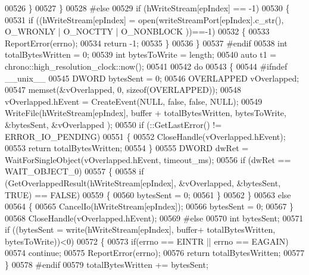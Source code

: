 \begin{DoxyCode}
00526         \}
00527     \}
00528 \textcolor{preprocessor}{#else}
00529     \textcolor{keywordflow}{if} (hWriteStream[epIndex] == -1)
00530     \{
00531        \textcolor{keywordflow}{if} ((hWriteStream[epIndex] = open(writeStreamPort[epIndex].c\_str(), O\_WRONLY | O\_NOCTTY | O\_NONBLOCK
      ))==-1)
00532        \{
00533             ReportError(errno);
00534             \textcolor{keywordflow}{return} -1;
00535        \}
00536     \}
00537 \textcolor{preprocessor}{#endif}
00538     \textcolor{keywordtype}{int} totalBytesWritten = 0;
00539     \textcolor{keywordtype}{int} bytesToWrite = length;
00540     \textcolor{keyword}{auto} t1 = chrono::high\_resolution\_clock::now();
00541 
00542     \textcolor{keywordflow}{do}
00543     \{
00544 \textcolor{preprocessor}{#ifndef \_\_unix\_\_}
00545         DWORD bytesSent = 0;
00546         OVERLAPPED  vOverlapped;
00547         memset(&vOverlapped, 0, \textcolor{keyword}{sizeof}(OVERLAPPED));
00548         vOverlapped.hEvent = CreateEvent(NULL, \textcolor{keyword}{false}, \textcolor{keyword}{false}, NULL);
00549         WriteFile(hWriteStream[epIndex], buffer + totalBytesWritten, bytesToWrite, &bytesSent, &vOverlapped
      );
00550         \textcolor{keywordflow}{if} (::GetLastError() != ERROR\_IO\_PENDING)
00551         \{
00552             CloseHandle(vOverlapped.hEvent);
00553             \textcolor{keywordflow}{return} totalBytesWritten;
00554         \}
00555         DWORD dwRet = WaitForSingleObject(vOverlapped.hEvent, timeout\_ms);
00556         \textcolor{keywordflow}{if} (dwRet == WAIT\_OBJECT\_0)
00557         \{
00558             \textcolor{keywordflow}{if} (GetOverlappedResult(hWriteStream[epIndex], &vOverlapped, &bytesSent, TRUE) == FALSE)
00559             \{
00560                 bytesSent = 0;
00561             \}
00562         \}
00563         \textcolor{keywordflow}{else}
00564         \{
00565             CancelIo(hWriteStream[epIndex]);
00566             bytesSent = 0;
00567         \}
00568         CloseHandle(vOverlapped.hEvent);
00569 \textcolor{preprocessor}{#else}
00570         \textcolor{keywordtype}{int} bytesSent;
00571         \textcolor{keywordflow}{if} ((bytesSent  = write(hWriteStream[epIndex], buffer+ totalBytesWritten, bytesToWrite))<0)
00572         \{
00573             \textcolor{keywordflow}{if}(errno == EINTR || errno == EAGAIN)
00574                 \textcolor{keywordflow}{continue};
00575             ReportError(errno);
00576             \textcolor{keywordflow}{return} totalBytesWritten;
00577         \}
00578 \textcolor{preprocessor}{#endif}
00579         totalBytesWritten += bytesSent;

\end{DoxyCode}
